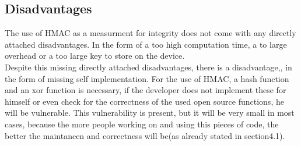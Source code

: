 \subsection{Disadvantages}
The use of HMAC as a measurment for integrity does not come with any directly attached disadvantages. In the form of a too high computation time, a to large overhead or a too large key to store on the device. \\
Despite this missing directly attached disadvantages, there is a disadvantage,, in the form of missing self implementation.
For the use of HMAC, a hash function and an xor function is necessary, if the developer does not implement these for himself or even check for the correctness of the used open source functions, he will be vulnerable. This vulnerability is present, but it will be very small in most cases, because the more people working on and using this pieces of code, the better the maintancen and correctness will be(as already stated in section4.1). 

